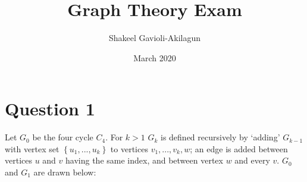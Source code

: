 \documentclass{article}
\title{Graph Theory Exam}
\author{Shakeel Gavioli-Akilagun}
\date{March 2020}
\begin{document}
\maketitle

\section*{Question 1}

Let $G_0$ be the four cycle $C_4$. For $k>1$ $G_k$ is defined recursively by `adding' $G_{k-1}$ with vertex set $\left \{ u_1, ...,u_k \right \}$ to vertices $v_1,...,v_k,w$; an edge is added between vertices $u$ and $v$ having the same index, and between vertex $w$ and every $v$. $G_0$ and $G_1$ are drawn below: 
\\

\begin{figure}[H]
    \centering

\begin{tikzpicture}[x=0.5pt,y=0.5pt,yscale=-1,xscale=1]


\end{tikzpicture}
\end{figure}
\end{document}

